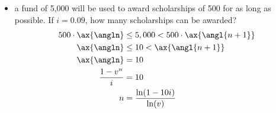 \documentclass[../00_main.tex]{subfiles}
\begin{document}
\begin{itemize}
    \item a fund of 5,000 will be used to award scholarships of 500 for as long
        as possible. If $i=0.09$, how many scholarships can be awarded?
        \begin{equation}\nonumber
            \begin{aligned}
                500 \cdot \ax{\angln} &\le 5,000 < 500 \cdot \ax{\angl{n+1}} \\
                \ax{\angln} &\le 10 < \ax{\angl{n+1}}   \\
                \ax{\angln} &= 10                       \\
                \frac{1-v^n}{i} &= 10                   \\
                n &= \frac{\ln(1-10i)}{\ln(v)}
            \end{aligned}
        \end{equation}
\end{itemize}
\end{document}
